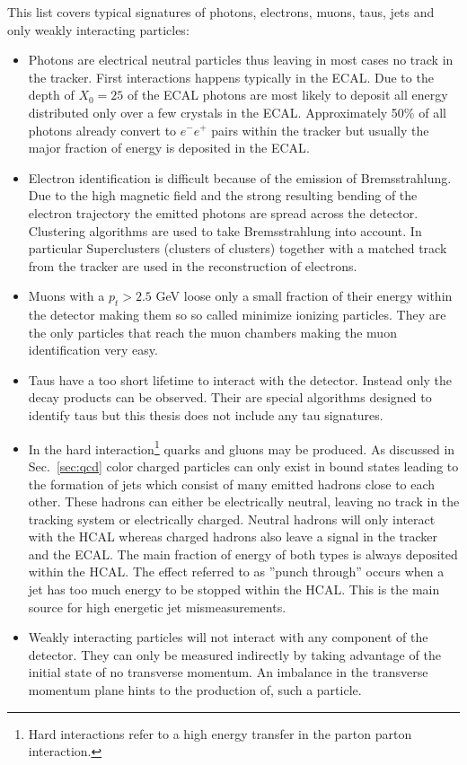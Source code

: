 This list covers typical signatures of photons, electrons, muons, taus, jets and only weakly interacting particles:

\begin{itemize}
 \item Photons are electrical neutral particles thus leaving in most cases no track in the tracker. First interactions happens typically in the ECAL. Due to the depth of $X_0=25$ of the ECAL photons are most likely to deposit all energy distributed only over a few crystals in the ECAL. Approximately 50\% of all photons already convert to $e^-e^+$ pairs within the tracker but usually the major fraction of energy is deposited in the ECAL\cite{CMS-PAS-EGM-10-005}.
 \item Electron identification is difficult because of the emission of Bremsstrahlung. Due to the high magnetic field and the strong resulting bending of the electron trajectory the emitted photons are spread across the detector. Clustering algorithms are used to take Bremsstrahlung into account. In particular Superclusters (clusters of clusters) together with a matched track from the tracker are used in the reconstruction of electrons\cite{CMS-PAS-EGM-10-004}.  
 \item Muons with a $p_t> 2.5$ GeV loose only a small fraction of their energy within the detector\cite{CMS-PAS-MUO-10-002} making them so so called minimize ionizing particles. They are the only particles that reach the muon chambers making the muon identification very easy.
 \item Taus have a too short lifetime to interact with the detector. Instead only the decay products can be observed. Their are  special algorithms designed to identify taus but this thesis does not include any tau signatures.
 \item In the hard interaction\footnote{Hard interactions refer to a high energy transfer in the parton parton interaction.} quarks and gluons may be produced. As discussed in Sec.~\ref{sec:qcd} color charged particles can only exist in bound states leading to the formation of jets which consist of many emitted hadrons close to each other. These hadrons can either be electrically neutral, leaving no track in the tracking system or electrically charged. Neutral hadrons will only interact with the HCAL whereas charged hadrons also leave a signal in the tracker and the ECAL. The main fraction of energy of both types is always deposited within the HCAL. The effect referred to as ''punch through'' occurs when a jet has too much energy to be stopped within the HCAL. This is the main source for high energetic jet mismeasurements. 
 \item Weakly interacting particles will not interact with any component of the detector. They can only be measured indirectly by taking advantage of the initial state of no transverse momentum. An imbalance in the transverse momentum plane hints to the production of, such a particle. 
\end{itemize}

